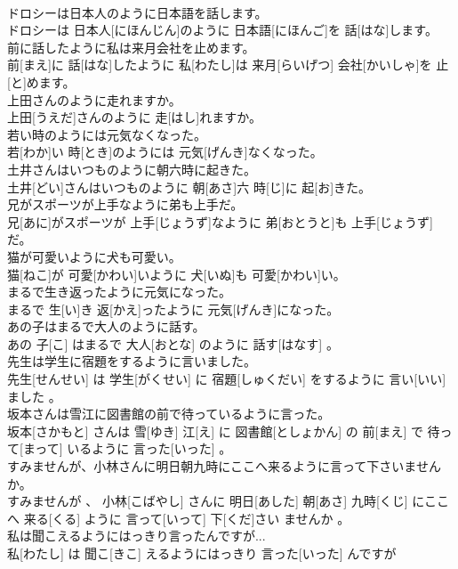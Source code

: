\documentclass[8pt]{extreport}
\begin{document}
\begin{CJK}{UTF8}{min}
\\	ドロシーは日本人のように日本語を話します。	
\\	ドロシーは 日本人[にほんじん]のように 日本語[にほんご]を 話[はな]します。
\\	前に話したように私は来月会社を止めます。	
\\	前[まえ]に 話[はな]したように 私[わたし]は 来月[らいげつ] 会社[かいしゃ]を 止[と]めます。
\\	上田さんのように走れますか。	
\\	上田[うえだ]さんのように 走[はし]れますか。
\\	若い時のようには元気なくなった。	
\\	若[わか]い 時[とき]のようには 元気[げんき]なくなった。
\\	土井さんはいつものように朝六時に起きた。	
\\	土井[どい]さんはいつものように 朝[あさ]六 時[じ]に 起[お]きた。
\\	兄がスポーツが上手なように弟も上手だ。	
\\	兄[あに]がスポーツが 上手[じょうず]なように 弟[おとうと]も 上手[じょうず]だ。
\\	猫が可愛いように犬も可愛い。	
\\	猫[ねこ]が 可愛[かわい]いように 犬[いぬ]も 可愛[かわい]い。
\\	まるで生き返ったように元気になった。	
\\	まるで 生[い]き 返[かえ]ったように 元気[げんき]になった。
\\	あの子はまるで大人のように話す。	
\\	あの 子[こ] はまるで 大人[おとな] のように 話す[はなす] 。
\\	先生は学生に宿題をするように言いました。	
\\	先生[せんせい] は 学生[がくせい] に 宿題[しゅくだい] をするように 言い[いい] ました 。
\\	坂本さんは雪江に図書館の前で待っているように言った。	
\\	坂本[さかもと] さんは 雪[ゆき] 江[え] に 図書館[としょかん] の 前[まえ] で 待って[まって] いるように 言った[いった] 。
\\	すみませんが、小林さんに明日朝九時にここへ来るように言って下さいませんか。	
\\	すみませんが 、 小林[こばやし] さんに 明日[あした] 朝[あさ] 九時[くじ] にここへ 来る[くる] ように 言って[いって] 下[くだ]さい ませんか 。
\\	私は聞こえるようにはっきり言ったんですが...	
\\	私[わたし] は 聞こ[きこ] えるようにはっきり 言った[いった] んですが 

\end{CJK}
\end{document}

